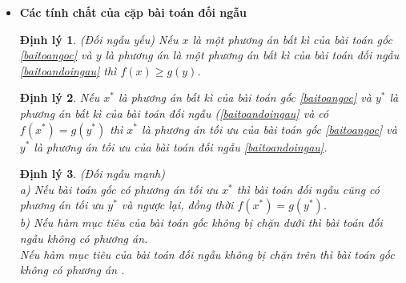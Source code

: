\documentclass[12pt,a4paper]{report}
\newtheorem{dl}{Định lý}[chapter]
\begin{document}
\begin{itemize}
      \begin{minipage}[t]{0.48\linewidth}
    Bài toán gốc
   \begin{equation}
       \begin{split}
           &{\rm{Min }} \langle c,x \rangle\\
          \rm{s.t} &\left\{\begin{split}
            & Ax= b\\
            & x \ge 0\\
           \end{split}\right.
       \end{split}
   \end{equation}
\end{minipage}\hfill
\begin{minipage}[t]{0.48\linewidth}
Bài toán đối ngẫu
\begin{equation}
    \begin{split}
        &{\rm{Max}} \langle b,y \rangle\\
       \rm{s.t} & \left\{\begin{split}
            & A^Ty \le (\ge) c\\
            & y \hspace{0.1cm1cm} \text{tự do}\\
        \end{split}\right.
    \end{split}
\end{equation}
\end{minipage}
\item\textbf{Các tính chất của cặp bài toán đối ngẫu}
\begin{dl}\label{doingauyeu}
(Đối ngẫu yếu) Nếu $x$ là một phương án bất kì của bài toán gốc \eqref{baitoangoc} và $y$ là phương án là một phương án bất kì của bài toán đối ngẫu \eqref{baitoandoingau} thì $f(x)\ge g(y) $.
    \end{dl}
   
    \begin{dl}
        Nếu $x^*$ là phương án bất kì của bài toán gốc \eqref{baitoangoc} và $y^*$ là phương án bất kì của bài toán đối ngẫu (\eqref{baitoandoingau} và có $f(x^*)=g(y^*)$ thì $x^*$ là phương án tối ưu của bài toán gốc \eqref{baitoangoc} và $y^*$ là phương án tối ưu của bài toán đối ngẫu \eqref{baitoandoingau}.\\
    \end{dl}

\begin{dl}
        (Đối ngẫu mạnh) \\
      a) Nếu bài toán gốc có phương án tối ưu $x^*$ thì bài toán đối ngẫu cũng có phương án tối ưu $y^*$ và ngược lại, đồng thời $f(x^*)=g(y^*)$.\\
      b) Nếu hàm mục tiêu của bài toán gốc không bị chặn dưới thì bài toán đối ngẫu không có phương án.\\
        Nếu hàm mục tiêu của bài toán đối ngẫu không bị chặn trên thì bài toán gốc không có phương án .
    \end{dl}


\end{itemize}
\end{document}
